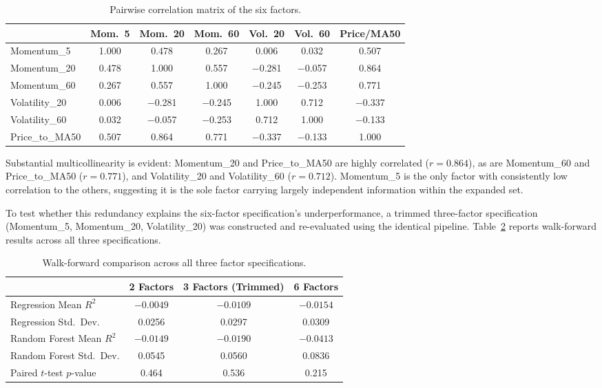 \documentclass[11pt]{article}
\begin{document}
\begin{table}[h]
\centering
\small
\begin{tabular}{lcccccc}
\toprule
& Mom.\ 5 & Mom.\ 20 & Mom.\ 60 & Vol.\ 20 & Vol.\ 60 & Price/MA50 \\
\midrule
Momentum\_5 & 1.000 & 0.478 & 0.267 & 0.006 & 0.032 & 0.507 \\
Momentum\_20 & 0.478 & 1.000 & 0.557 & $-$0.281 & $-$0.057 & 0.864 \\
Momentum\_60 & 0.267 & 0.557 & 1.000 & $-$0.245 & $-$0.253 & 0.771 \\
Volatility\_20 & 0.006 & $-$0.281 & $-$0.245 & 1.000 & 0.712 & $-$0.337 \\
Volatility\_60 & 0.032 & $-$0.057 & $-$0.253 & 0.712 & 1.000 & $-$0.133 \\
Price\_to\_MA50 & 0.507 & 0.864 & 0.771 & $-$0.337 & $-$0.133 & 1.000 \\
\bottomrule
\end{tabular}
\caption{Pairwise correlation matrix of the six factors.}
\label{tab:correlation}
\end{table}

Substantial multicollinearity is evident: Momentum\_20 and Price\_to\_MA50 are highly correlated ($r = 0.864$), as are Momentum\_60 and Price\_to\_MA50 ($r = 0.771$), and Volatility\_20 and Volatility\_60 ($r = 0.712$). Momentum\_5 is the only factor with consistently low correlation to the others, suggesting it is the sole factor carrying largely independent information within the expanded set.

To test whether this redundancy explains the six-factor specification's underperformance, a trimmed three-factor specification (Momentum\_5, Momentum\_20, Volatility\_20) was constructed and re-evaluated using the identical pipeline. Table~\ref{tab:trimmed_comparison} reports walk-forward results across all three specifications.

\begin{table}[h]
\centering
\begin{tabular}{lccc}
\toprule
& 2 Factors & 3 Factors (Trimmed) & 6 Factors \\
\midrule
Regression Mean $R^2$ & $-0.0049$ & $-0.0109$ & $-0.0154$ \\
Regression Std.\ Dev. & 0.0256 & 0.0297 & 0.0309 \\
Random Forest Mean $R^2$ & $-0.0149$ & $-0.0190$ & $-0.0413$ \\
Random Forest Std.\ Dev. & 0.0545 & 0.0560 & 0.0836 \\
Paired $t$-test $p$-value & 0.464 & 0.536 & 0.215 \\
\bottomrule
\end{tabular}
\caption{Walk-forward comparison across all three factor specifications.}
\label{tab:trimmed_comparison}
\end{table}
\end{document}
